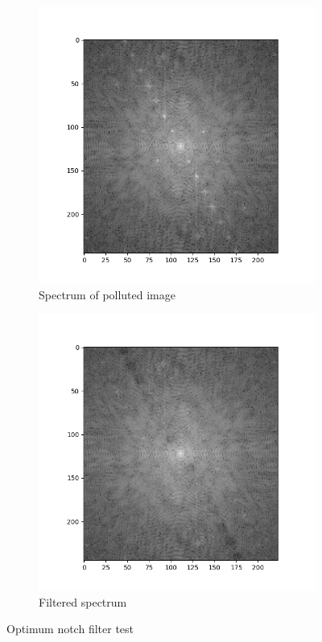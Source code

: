 \documentclass[UTF8]{ctexart}
\begin{document}
\begin{figure}[htbp]
    \vspace{0.5cm}
    \centering
    \begin{subfigure}{0.5\textwidth}
        \centering
        \includegraphics[width=1\linewidth]{spectrum_noised.png}
        \caption{Spectrum of polluted image}
    \end{subfigure}%
    \hfill
    \begin{subfigure}{0.5\textwidth}
        \centering
        \includegraphics[width=\linewidth]{spectrum_cleaned.png}
        \caption{Filtered spectrum}
    \end{subfigure}%
    \caption{Optimum notch filter test}
    \label{fig:brain1}
\end{figure}
\end{document}

